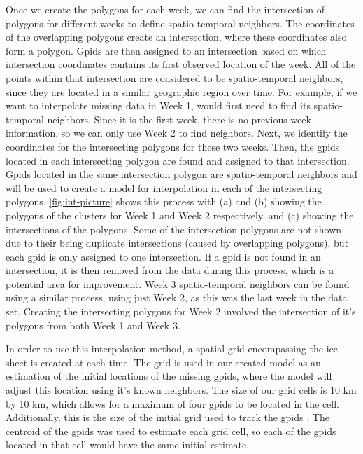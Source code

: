\documentclass[12pt]{article}
\begin{document}
Once we create the polygons for each week, we can find the intersection
of polygons for different weeks to define spatio-temporal neighbors. The
coordinates of the overlapping polygons create an intersection, where
these coordinates also form a polygon. Gpids are then assigned to an
intersection based on which intersection coordinates contains its first
observed location of the week. All of the points within that
intersection are considered to be spatio-temporal neighbors, since they
are located in a similar geographic region over time. For example, if we
want to interpolate missing data in Week 1, would first need to find its
spatio-temporal neighbors. Since it is the first week, there is no
previous week information, so we can only use Week 2 to find neighbors.
Next, we identify the coordinates for the intersecting polygons for
these two weeks. Then, the gpids located in each intersecting polygon
are found and assigned to that intersection. Gpids located in the same
intersection polygon are spatio-temporal neighbors and will be used to
create a model for interpolation in each of the intersecting polygons.
\cref{fig:int-picture} shows this process with (a) and (b) showing the
polygons of the clusters for Week 1 and Week 2 respectively, and (c)
showing the intersections of the polygons. Some of the intersection
polygons are not shown due to their being duplicate intersections
(caused by overlapping polygons), but each gpid is only assigned to one
intersection. If a gpid is not found in an intersection, it is then
removed from the data during this process, which is a potential area for
improvement. Week 3 spatio-temporal neighbors can be found using a
similar process, using just Week 2, as this was the last week in the
data set. Creating the intersecting polygons for Week 2 involved the
intersection of it's polygons from both Week 1 and Week 3.

In order to use this interpolation method, a spatial grid encompassing
the ice sheet is created at each time. The grid is used in our created
model as an estimation of the initial locations of the missing gpids,
where the model will adjust this location using it's known neighbors.
The size of our grid cells is 10 km by 10 km, which allows for a maximum
of four gpids to be located in the cell. Additionally, this is the size
of the initial grid used to track the gpids \citep{kwok_seasonal_2002}.
The centroid of the gpids was used to estimate each grid cell, so each
of the gpids located in that cell would have the same initial estimate.
\end{document}
